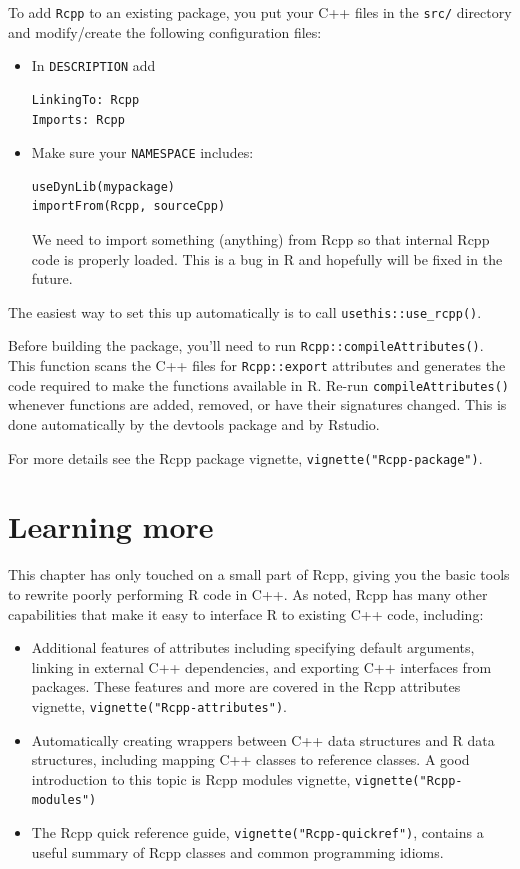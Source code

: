 \documentclass[]{book}
\begin{document}
To add \texttt{Rcpp} to an existing package, you put your C++ files in the \texttt{src/} directory and modify/create the following configuration files:

\begin{itemize}
\item
  In \texttt{DESCRIPTION} add

\begin{verbatim}
LinkingTo: Rcpp
Imports: Rcpp
\end{verbatim}
\item
  Make sure your \texttt{NAMESPACE} includes:

\begin{verbatim}
useDynLib(mypackage)
importFrom(Rcpp, sourceCpp)
\end{verbatim}

  We need to import something (anything) from Rcpp so that internal Rcpp code
  is properly loaded. This is a bug in R and hopefully will be fixed in the
  future.
\end{itemize}

The easiest way to set this up automatically is to call \texttt{usethis::use\_rcpp()}.

Before building the package, you'll need to run \texttt{Rcpp::compileAttributes()}. This function scans the C++ files for \texttt{Rcpp::export} attributes and generates the code required to make the functions available in R. Re-run \texttt{compileAttributes()} whenever functions are added, removed, or have their signatures changed. This is done automatically by the devtools package and by Rstudio.

For more details see the Rcpp package vignette, \texttt{vignette("Rcpp-package")}.

\hypertarget{rcpp-more}{%
\section{Learning more}\label{rcpp-more}}

This chapter has only touched on a small part of Rcpp, giving you the basic tools to rewrite poorly performing R code in C++. As noted, Rcpp has many other capabilities that make it easy to interface R to existing C++ code, including:

\begin{itemize}
\item
  Additional features of attributes including specifying default arguments,
  linking in external C++ dependencies, and exporting C++ interfaces from
  packages. These features and more are covered in the Rcpp attributes vignette,
  \texttt{vignette("Rcpp-attributes")}.
\item
  Automatically creating wrappers between C++ data structures and R data
  structures, including mapping C++ classes to reference classes. A good
  introduction to this topic is Rcpp modules vignette,
  \texttt{vignette("Rcpp-modules")}
\item
  The Rcpp quick reference guide, \texttt{vignette("Rcpp-quickref")}, contains a useful
  summary of Rcpp classes and common programming idioms.
\end{itemize}
\end{document}
